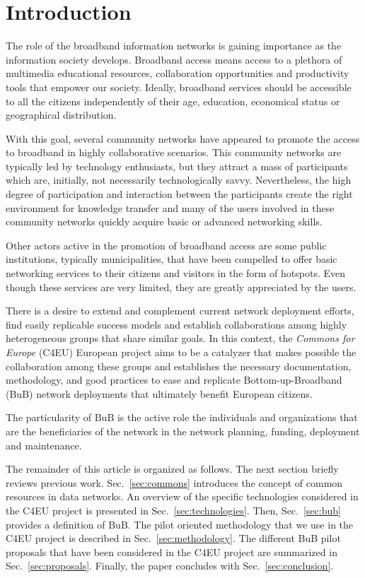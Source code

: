 \documentclass[conference]{IEEEtran}
\begin{document}
\section{Introduction}
The role of the broadband information networks is gaining importance as the information society develops.
Broadband access means access to a plethora of multimedia educational resources, collaboration opportunities and productivity tools that empower our society.
Ideally, broadband services should be accessible to all the citizens independently of their age, education, economical status or geographical distribution.

With this goal, several community networks have appeared to promote the access to broadband in highly collaborative scenarios.
This community networks are typically led by technology enthusiasts, but they attract a mass of participants which are, initially, not necessarily technologically savvy. 
Nevertheless, the high degree of participation and interaction between the participants create the right environment for knowledge transfer and many of the users involved in these community networks quickly acquire basic or advanced networking skills.

Other actors active in the promotion of broadband access are some public institutions, typically municipalities, that have been compelled to offer basic networking services to their citizens and visitors in the form of hotspots.
Even though these services are very limited, they are greatly appreciated by the users.

There is a desire to extend and complement current network deployment efforts, find easily replicable success models and establish collaborations among highly heterogeneous groups that share similar goals.
In this context, the \emph{Commons for Europe} (C4EU) European project aims to be a catalyzer that makes possible the collaboration among these groups and establishes the necessary documentation, methodology, and good practices to ease and replicate Bottom-up-Broadband (BuB) network deployments that ultimately benefit European citizens.

The particularity of BuB is the active role the individuals and organizations that are the beneficiaries of the network in the network planning, funding, deployment and maintenance.

The remainder of this article is organized as follows.
The next section briefly reviews previous work.
Sec.~\ref{sec:commons} introduces the concept of common resources in data networks.
An overview of the specific technologies considered in the C4EU project is presented in Sec.~\ref{sec:technologies}.
Then, Sec.~\ref{sec:bub} provides a definition of BuB.
The pilot oriented methodology that we use in the C4EU project is described in Sec.~\ref{sec:methodology}.
The different BuB pilot proposals that have been considered in the C4EU project are summarized in Sec.~\ref{sec:proposals}.
Finally, the paper concludes with Sec.~\ref{sec:conclusion}.
\end{document}
